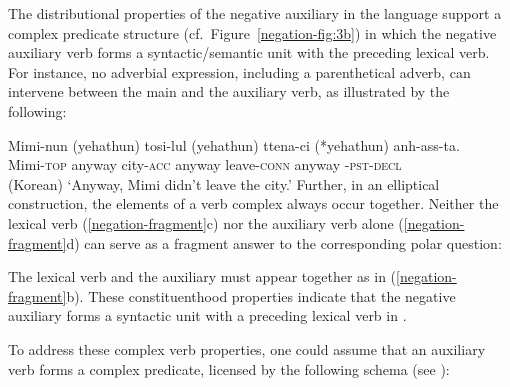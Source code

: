 \documentclass[output=paper
 	        ,biblatex
                ,babelshorthands
                ,newtxmath
                ,draftmode
                ,colorlinks, citecolor=brown
]{langscibook}
\begin{document}
\begin{exe}
\begin{xlist}
\begin{exe}
\begin{xlist}
The distributional properties of the negative auxiliary in the language support
 a complex predicate structure (cf.\ Figure~\ref{negation-fig:3b}) in which the negative auxiliary verb
forms a syntactic/semantic unit with the preceding lexical verb.
For instance, no adverbial expression, including
a parenthetical adverb, can intervene between
the main and the auxiliary verb, as illustrated by the
following:

\ea
\gll Mimi-nun          (yehathun)           tosi-lul          (yehathun)           ttena-ci            (*yehathun) anh-ass-ta. \\
     Mimi-\textsc{top} \hphantom{(}anyway city-\textsc{acc} \hphantom{(}anyway leave-\textsc{conn} \hphantom{(*}anyway \NEG-\textsc{pst}-\textsc{decl} \\\hfill(Korean)
\glt `Anyway, Mimi didn't leave the city.'
\z
%
Further, in an elliptical construction, the elements of a verb complex
 always occur together. Neither the lexical  verb (\ref{negation-fragment}c) nor the
 auxiliary verb alone (\ref{negation-fragment}d) can serve
as a fragment answer to the corresponding polar question:

\eal
\label{negation-fragment}
\zl

\noindent
The lexical verb and the auxiliary must appear together as in (\ref{negation-fragment}b). These
constituenthood properties indicate that the negative auxiliary forms a syntactic unit with a
preceding lexical  verb in . 

To address these complex verb properties, one could assume that
an auxiliary verb forms a complex predicate, licensed by
the following schema (see \citealt[95]{Kim:16}):


\end{xlist}
\end{exe}
\end{xlist}
\end{exe}
\end{document}
